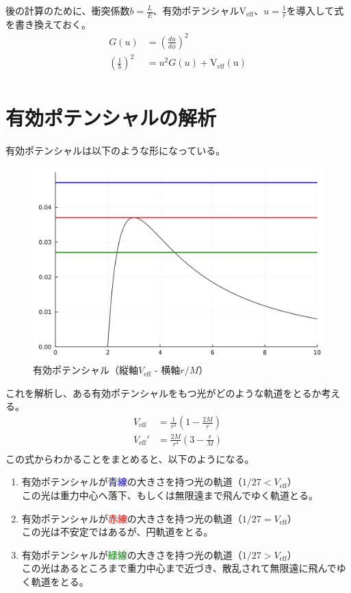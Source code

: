 \documentclass[dvipdfmx]{report} %
\begin{document}
後の計算のために、衝突係数$b = \frac{L}{E}$、有効ポテンシャル$\mathrm{V_{eff}}$、$u=\frac{1}{r}$を導入して式を書き換えておく。
\begin{equation*}
\begin{split}
	G(u) 	&= \left( \frac{du}{d\phi} \right)^2\\ 
	\left( \frac{1}{b} \right)^2 &=
			u^2 G(u) + \mathrm{V_{eff}(u)}\\
\end{split}
\end{equation*}

\section{有効ポテンシャルの解析}
有効ポテンシャルは以下のような形になっている。
\begin{figure}[H]
    \centering
    \includegraphics[width=0.5\columnwidth]{./images/schwa/v-eff.png}
    \caption{有効ポテンシャル（縦軸$V_{\mathrm{eff}}$ - 横軸$r/M$）}
    \label{}
\end{figure}
これを解析し、ある有効ポテンシャルをもつ光がどのような軌道をとるか考える。
\begin{equation*}
\begin{split}
	V_{\mathrm{eff}} &= \frac{1}{r^2} \left( 1 - \frac{2M}{r} \right) \\
	V_{\mathrm{eff}}' &= \frac{2M}{r^4} \left( 3 - \frac{r}{M} \right) \\
\end{split}
\end{equation*}
この式からわかることをまとめると、以下のようになる。
\begin{enumerate}[(1)\,]
\item{有効ポテンシャルが\textcolor{blue}{青線}の大きさを持つ光の軌道（$1/27 < V_{\mathrm{eff}}$）}\\
この光は重力中心へ落下、もしくは無限遠まで飛んでゆく軌道とる。
\item{有効ポテンシャルが\textcolor{red}{赤線}の大きさを持つ光の軌道（$1/27 = V_{\mathrm{eff}}$）}\\
この光は不安定ではあるが、円軌道をとる。
\item{有効ポテンシャルが\textcolor{green}{緑線}の大きさを持つ光の軌道（$1/27 > V_{\mathrm{eff}}$）}\\
この光はあるところまで重力中心まで近づき、散乱されて無限遠に飛んでゆく軌道をとる。
\end{enumerate}
\end{document}
